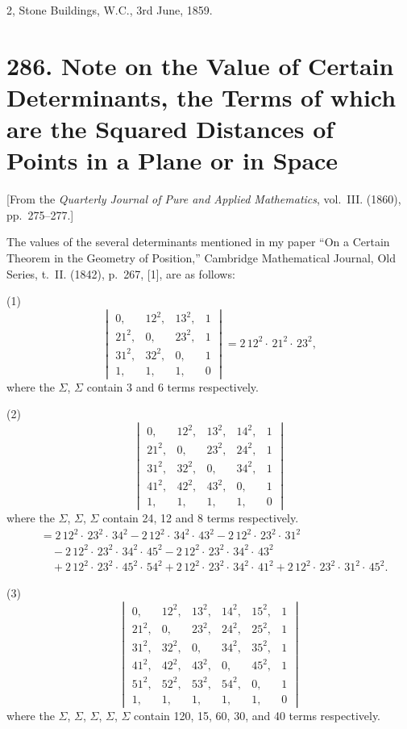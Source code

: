 \documentclass[11pt,a4paper]{article}
\theoremstyle{plain}
\begin{document}
\hfill 2, Stone Buildings, W.C., 3rd June, 1859.


\newpage
\section*{286. Note on the Value of Certain Determinants, the Terms of which are the Squared Distances of Points in a Plane or in Space}
\label{sec:286}

[From the \textit{Quarterly Journal of Pure and Applied Mathematics}, vol.~III. (1860), pp.~275--277.]

The values of the several determinants mentioned in my paper ``On a Certain Theorem in the Geometry of Position,'' Cambridge Mathematical Journal, Old Series, t.~II. (1842), p.~267, [1], are as follows:

(1)
\[
\begin{vmatrix}
0, & 12^2, & 13^2, & 1 \\
21^2, & 0, & 23^2, & 1 \\
31^2, & 32^2, & 0, & 1 \\
1, & 1, & 1, & 0
\end{vmatrix}
= 2\,12^2\cdot\,21^2\cdot\,23^2,
\]
where the $\Sigma$, $\Sigma$ contain 3 and 6 terms respectively.

(2)
\[
\begin{vmatrix}
0, & 12^2, & 13^2, & 14^2, & 1 \\
21^2, & 0, & 23^2, & 24^2, & 1 \\
31^2, & 32^2, & 0, & 34^2, & 1 \\
41^2, & 42^2, & 43^2, & 0, & 1 \\
1, & 1, & 1, & 1, & 0
\end{vmatrix}
\]
where the $\Sigma$, $\Sigma$, $\Sigma$ contain 24, 12 and 8 terms respectively.
\begin{align*}
&= 2\,12^2\cdot\,23^2\cdot\,34^2 - 2\,12^2\cdot\,34^2\cdot\,43^2 - 2\,12^2\cdot\,23^2\cdot\,31^2\\
&\quad - 2\,12^2\cdot\,23^2\cdot\,34^2\cdot\,45^2 - 2\,12^2\cdot\,23^2\cdot\,34^2\cdot\,43^2\\
&\quad + 2\,12^2\cdot\,23^2\cdot\,45^2\cdot\,54^2 + 2\,12^2\cdot\,23^2\cdot\,34^2\cdot\,41^2 + 2\,12^2\cdot\,23^2\cdot\,31^2\cdot\,45^2.
\end{align*}

(3)
\[
\begin{vmatrix}
0, & 12^2, & 13^2, & 14^2, & 15^2, & 1 \\
21^2, & 0, & 23^2, & 24^2, & 25^2, & 1 \\
31^2, & 32^2, & 0, & 34^2, & 35^2, & 1 \\
41^2, & 42^2, & 43^2, & 0, & 45^2, & 1 \\
51^2, & 52^2, & 53^2, & 54^2, & 0, & 1 \\
1, & 1, & 1, & 1, & 1, & 0
\end{vmatrix}
\]
where the $\Sigma$, $\Sigma$, $\Sigma$, $\Sigma$, $\Sigma$ contain 120, 15, 60, 30, and 40 terms respectively.
\end{document}
